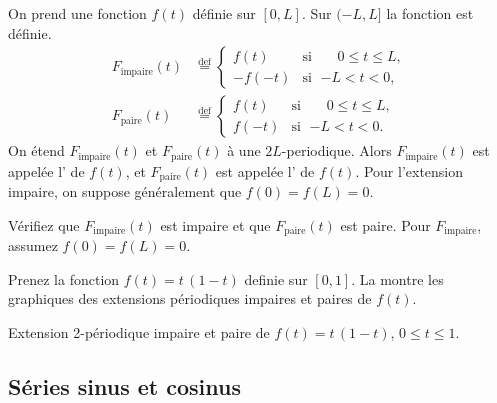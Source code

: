 On prend une fonction $f(t)$ définie sur $[0,L]$.  Sur $(-L,L]$ la fonction est définie.
\begin{align*}
F_{\text{impaire}}(t) & \overset{\text{def}}{=}
\begin{cases}
f(t) & \text{si } \; \phantom{-}0 \leq t \leq L , \\
-f(-t) & \text{si } \; {-L} < t < 0 ,
\end{cases}
\\
F_{\text{paire}}(t) & \overset{\text{def}}{=}
\begin{cases}
f(t) & \text{si } \; \phantom{-}0 \leq t \leq L , \\
f(-t) & \text{si } \; {-L} < t < 0 .
\end{cases}
\end{align*}
On étend $F_{\text{impaire}}(t)$ et $F_{\text{paire}}(t)$ à une $2L$-periodique.
Alors
$F_{\text{impaire}}(t)$ est appelée l' \emph{} de $f(t)$, et
$F_{\text{paire}}(t)$ est appelée l'
\emph{} de $f(t)$.
Pour l'extension impaire, on suppose généralement que $f(0) = f(L) = 0$.

\begin{exercise}
Vérifiez que $F_{\text{impaire}}(t)$ est impaire et que  $F_{\text{paire}}(t)$ est paire.
Pour $F_{\text{impaire}}$,
assumez $f(0) = f(L) = 0$.
\end{exercise}

\begin{example}
Prenez la fonction $f(t) = t\,(1-t)$ definie sur $[0,1]$. 
La 
montre les graphiques des extensions périodiques impaires et paires de $f(t)$.

\begin{myfig}
\capstart
\caption{Extension 2-périodique impaire et paire de $f(t) =
t\,(1-t)$, $0 \leq t \leq 1$.\label{scs:oddevenextfig}}
\end{myfig}
\end{example}

\subsection{Séries sinus et cosinus}

